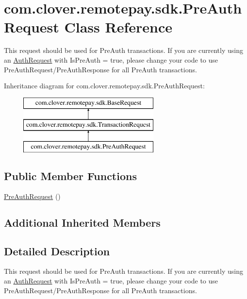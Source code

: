 \hypertarget{classcom_1_1clover_1_1remotepay_1_1sdk_1_1_pre_auth_request}{}\section{com.\+clover.\+remotepay.\+sdk.\+Pre\+Auth\+Request Class Reference}
\label{classcom_1_1clover_1_1remotepay_1_1sdk_1_1_pre_auth_request}


This request should be used for Pre\+Auth transactions. If you are currently using an \hyperlink{classcom_1_1clover_1_1remotepay_1_1sdk_1_1_auth_request}{Auth\+Request} with Is\+Pre\+Auth = true, please change your code to use Pre\+Auth\+Request/\+Pre\+Auth\+Response for all Pre\+Auth transactions.  


Inheritance diagram for com.\+clover.\+remotepay.\+sdk.\+Pre\+Auth\+Request\+:\begin{figure}[H]
\begin{center}
\leavevmode
\includegraphics[height=3.000000cm]{classcom_1_1clover_1_1remotepay_1_1sdk_1_1_pre_auth_request}
\end{center}
\end{figure}
\subsection*{Public Member Functions}
\begin{DoxyCompactItemize}
\item 
\hyperlink{classcom_1_1clover_1_1remotepay_1_1sdk_1_1_pre_auth_request_a66a1852aa8059f5ddf1da5a64b2b4067}{Pre\+Auth\+Request} ()
\end{DoxyCompactItemize}
\subsection*{Additional Inherited Members}


\subsection{Detailed Description}
This request should be used for Pre\+Auth transactions. If you are currently using an \hyperlink{classcom_1_1clover_1_1remotepay_1_1sdk_1_1_auth_request}{Auth\+Request} with Is\+Pre\+Auth = true, please change your code to use Pre\+Auth\+Request/\+Pre\+Auth\+Response for all Pre\+Auth transactions. 



